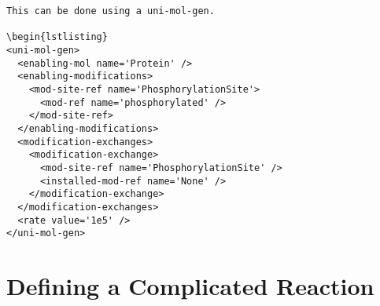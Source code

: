 \begin{lstlisting}
This can be done using a uni-mol-gen.

\begin{lstlisting}
<uni-mol-gen>
  <enabling-mol name='Protein' />
  <enabling-modifications>
    <mod-site-ref name='PhosphorylationSite'>
      <mod-ref name='phosphorylated' />
    </mod-site-ref>
  </enabling-modifications>
  <modification-exchanges>
    <modification-exchange>
      <mod-site-ref name='PhosphorylationSite' />
      <installed-mod-ref name='None' />
    </modification-exchange>
  </modification-exchanges>
  <rate value='1e5' />
</uni-mol-gen>
\end{lstlisting}

\section{Defining a Complicated Reaction}